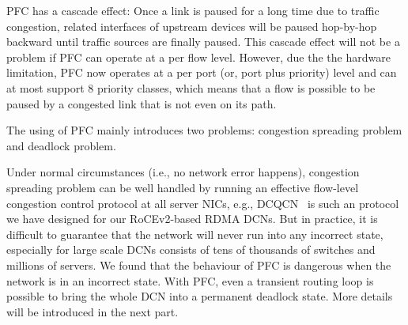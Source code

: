 PFC has a cascade effect: Once a link is paused for a long time due to traffic congestion, related interfaces of upstream devices will be paused hop-by-hop backward until traffic sources are finally paused. This cascade effect will not be a problem if PFC can operate at a per flow level. However, due the the hardware limitation, PFC now operates at a per port (or, port plus priority) level and can at most support 8 priority classes, which means that a flow is possible to be paused by a congested link that is not even on its path.

The using of PFC mainly introduces two problems: congestion spreading problem and deadlock problem.

Under normal circumstances (i.e., no network error happens), congestion spreading problem can be well handled by running an effective flow-level congestion control protocol at all server NICs, e.g., DCQCN~\cite{dcqcn} is such an protocol we have designed for our RoCEv2-based RDMA DCNs. But in practice, it is difficult to guarantee that the network will never run into any incorrect state, especially for large scale DCNs consists of tens of thousands of switches and millions of servers. We found that the behaviour of PFC is dangerous when the network is in an incorrect state. With PFC, even a transient routing loop is possible to bring the whole DCN into a permanent deadlock state. More details will be introduced in the next part.
%
%

%
%
%
%
%


